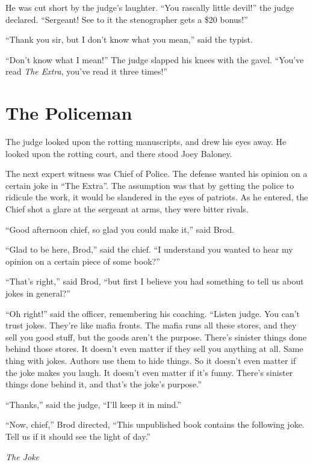 \documentclass[oneside]{book}
\begin{document}
He was cut short by the judge's laughter.  ``You rascally little devil!'' the judge
declared.  ``Sergeant!  See to it the stenographer gets a \$20 bonus!''

``Thank you sir, but I don't know what you mean,'' said the typist.

``Don't know what I mean!''  The judge slapped his knees with the gavel.  ``You've read \emph{The Extra},
you've read it three times!''


\chapter{The Policeman}

The judge looked upon the rotting manuscripts, and drew his eyes away.
He looked upon the rotting court, and there stood Joey Baloney.

The next expert witness was Chief of Police.  The defense wanted his opinion on a certain
joke in ``The Extra''.  The assumption was that by getting the police to ridicule the work,
it would be slandered in the eyes of patriots.  As he entered, the Chief
shot a glare at the sergeant at arms, they were bitter rivals.

``Good afternoon chief, so glad you could make it,'' said Brod.

``Glad to be here, Brod,'' said the chief.  ``I understand you wanted to hear my opinion on a certain
piece of some book?''

``That's right,'' said Brod, ``but first I believe you had something to tell us about jokes in general?''

``Oh right!'' said the officer, remembering his coaching.  ``Listen judge.  You can't trust jokes.
They're like mafia fronts.  The mafia runs all these stores, and they sell you good stuff, but the goods aren't
the purpose.  There's sinister things done behind those stores.  It doesn't even matter if they
sell you anything at all.  Same thing with jokes.  Authors use them to hide things.  So it doesn't even matter
if the joke makes you laugh.  It doesn't even matter if it's funny.  There's sinister things done behind it,
and that's the joke's purpose.''

``Thanks,'' said the judge, ``I'll keep it in mind.''

``Now, chief,'' Brod directed, ``This unpublished book contains the following joke.  Tell us if it should
see the light of day.''

\vspace{2mm}
\noindent \textit{The Joke}
\vspace{2mm}
\end{document}
